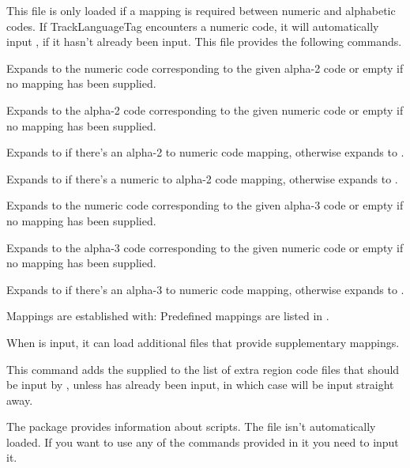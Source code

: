 \documentclass[titlepage=false,oneside,
 fontsize=12pt,captions=tableheading]{scrbook}
\begin{document}
This file is only loaded if a mapping is required between numeric
and alphabetic  codes. If \gls{TrackLanguageTag}
encounters a numeric  code, it will automatically input
, if it hasn't already been input.
This file provides the following commands.

Expands to the numeric code corresponding to the given alpha-2 code or
empty if no mapping has been supplied.

Expands to the alpha-2 code corresponding to the given numeric code or
empty if no mapping has been supplied.

Expands to  if there's an alpha-2 to numeric 
code mapping, otherwise expands to .

Expands to  if there's a numeric to alpha-2 
code mapping, otherwise expands to .

Expands to the numeric code corresponding to the given alpha-3 code or
empty if no mapping has been supplied.

Expands to the alpha-3 code corresponding to the given numeric code or
empty if no mapping has been supplied.

Expands to  if there's an alpha-3 to numeric 
code mapping, otherwise expands to .

Mappings are established with:
Predefined mappings are listed in .

When  is input, it can load
additional files that provide supplementary mappings.

This command adds the supplied  to the list of extra
region code files that should be input by
, unless
 has already been input, in which
case  will be input straight away.

The  package provides information about
 scripts. The file isn't automatically loaded. If
you want to use any of the commands provided in it you need to input
it.
\end{document}
